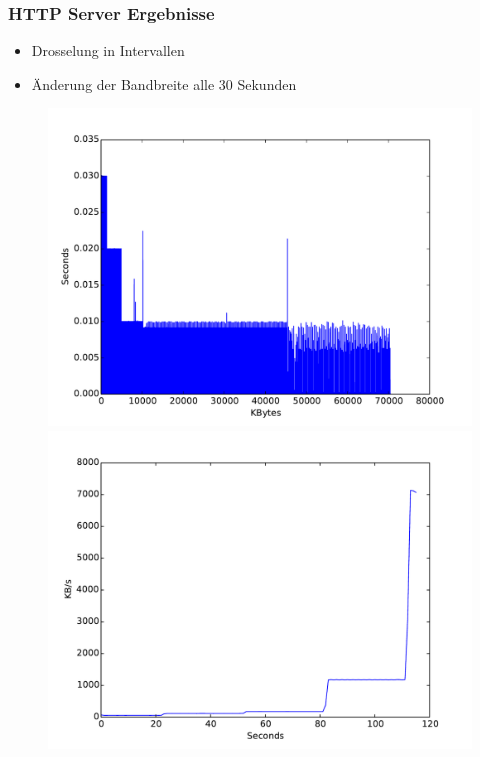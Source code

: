 \documentclass[handout]{beamer}
\begin{document}
\begin{frame}
\frametitle{HTTP Server Ergebnisse}
\begin{itemize}
\item Drosselung in Intervallen
\item Änderung der Bandbreite alle 30 Sekunden
\end{itemize}

\begin{figure}
\centering
\begin{minipage}[t]{0.4\linewidth}
			\centering
			\includegraphics[width=\linewidth]{images/seconds_http.pdf}
\end{minipage}
\begin{minipage}[t]{0.4\linewidth}
			\centering
			\includegraphics[width=\linewidth]{images/datarate_http.pdf}
\end{minipage}
\end{figure}
\end{frame}
\end{document}
